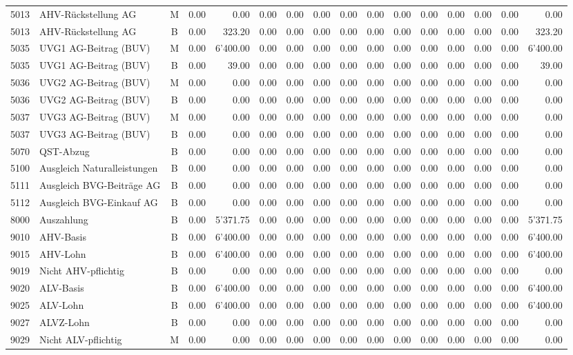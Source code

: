 \documentclass[8pt,a4paper]{extarticle}
\begin{document}
\begin{longtable}{@{\extracolsep{\fill}} l l c r r r r r r r r r r r r r}
5013&AHV-Rückstellung AG&M&0.00&0.00&0.00&0.00&0.00&0.00&0.00&0.00&0.00&0.00&0.00&0.00&0.00\\
5013&AHV-Rückstellung AG&B&0.00&323.20&0.00&0.00&0.00&0.00&0.00&0.00&0.00&0.00&0.00&0.00&323.20\\
5035&UVG1 AG-Beitrag (BUV)&M&0.00&6'400.00&0.00&0.00&0.00&0.00&0.00&0.00&0.00&0.00&0.00&0.00&6'400.00\\
5035&UVG1 AG-Beitrag (BUV)&B&0.00&39.00&0.00&0.00&0.00&0.00&0.00&0.00&0.00&0.00&0.00&0.00&39.00\\
5036&UVG2 AG-Beitrag (BUV)&M&0.00&0.00&0.00&0.00&0.00&0.00&0.00&0.00&0.00&0.00&0.00&0.00&0.00\\
5036&UVG2 AG-Beitrag (BUV)&B&0.00&0.00&0.00&0.00&0.00&0.00&0.00&0.00&0.00&0.00&0.00&0.00&0.00\\
5037&UVG3 AG-Beitrag (BUV)&M&0.00&0.00&0.00&0.00&0.00&0.00&0.00&0.00&0.00&0.00&0.00&0.00&0.00\\
5037&UVG3 AG-Beitrag (BUV)&B&0.00&0.00&0.00&0.00&0.00&0.00&0.00&0.00&0.00&0.00&0.00&0.00&0.00\\
5070&QST-Abzug&B&0.00&0.00&0.00&0.00&0.00&0.00&0.00&0.00&0.00&0.00&0.00&0.00&0.00\\
5100&Ausgleich Naturalleistungen&B&0.00&0.00&0.00&0.00&0.00&0.00&0.00&0.00&0.00&0.00&0.00&0.00&0.00\\
5111&Ausgleich BVG-Beiträge AG&B&0.00&0.00&0.00&0.00&0.00&0.00&0.00&0.00&0.00&0.00&0.00&0.00&0.00\\
5112&Ausgleich BVG-Einkauf AG&B&0.00&0.00&0.00&0.00&0.00&0.00&0.00&0.00&0.00&0.00&0.00&0.00&0.00\\
8000&Auszahlung&B&0.00&5'371.75&0.00&0.00&0.00&0.00&0.00&0.00&0.00&0.00&0.00&0.00&5'371.75\\
9010&AHV-Basis&B&0.00&6'400.00&0.00&0.00&0.00&0.00&0.00&0.00&0.00&0.00&0.00&0.00&6'400.00\\
9015&AHV-Lohn&B&0.00&6'400.00&0.00&0.00&0.00&0.00&0.00&0.00&0.00&0.00&0.00&0.00&6'400.00\\
9019&Nicht AHV-pflichtig&B&0.00&0.00&0.00&0.00&0.00&0.00&0.00&0.00&0.00&0.00&0.00&0.00&0.00\\
9020&ALV-Basis&B&0.00&6'400.00&0.00&0.00&0.00&0.00&0.00&0.00&0.00&0.00&0.00&0.00&6'400.00\\
9025&ALV-Lohn&B&0.00&6'400.00&0.00&0.00&0.00&0.00&0.00&0.00&0.00&0.00&0.00&0.00&6'400.00\\
9027&ALVZ-Lohn&B&0.00&0.00&0.00&0.00&0.00&0.00&0.00&0.00&0.00&0.00&0.00&0.00&0.00\\
9029&Nicht ALV-pflichtig&M&0.00&0.00&0.00&0.00&0.00&0.00&0.00&0.00&0.00&0.00&0.00&0.00&0.00\\

\end{longtable}
\end{document}
